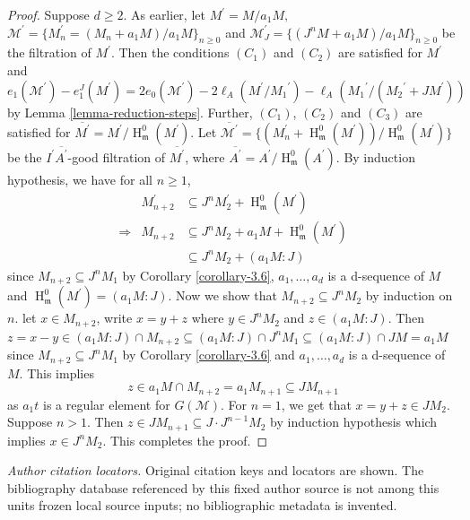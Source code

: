 \documentclass[10pt,a4paper]{amsart}
\def\M{{\mathcal M}}
\DeclareMathOperator{\h}{H}
\newcommand{\m}{\mathfrak m}
\begin{document}
\begin{proof}
	Suppose $d\geq 2.$ As earlier, let $M^\prime=M/a_1M,$ 
	$\M^\prime=\{M_n^\prime=(M_n+a_1M)/a_1M\}_{n\geq0}$ and $\M_J^\prime=\{(J^nM+a_1M)/a_1M\}_{n\geq 0}$ be the filtration of $M^\prime$. Then the conditions  $(C_1)$ and $(C_2)$ are satisfied for $M^\prime$ and
	$e_1(\M^\prime)-e_1^J(M^\prime)=2e_0(\M^\prime)-2\ell_A(M^\prime/{M_1}^\prime)-\ell_A({M_1}^\prime/({M_2}^\prime+JM^\prime))$ by Lemma \ref{lemma-reduction-steps}.
	Further, $(C_1)$, $(C_2)$ and $(C_3)$ are satisfied for $\overline{M^\prime}=M^\prime/\h_{\m}^0(M^\prime)$. 
	Let $\overline{\M^\prime} =\{(M_n^\prime+\h_{\m}^0(M^\prime))/\h_{\m}^0(M^\prime)\}$ be the $I^\prime \overline{A^\prime}$-good filtration of $\overline{M^\prime}$, where $\overline{A^\prime}=A^\prime/\h_{\m}^0(A^\prime)$. 
	By induction hypothesis, we have for all $n\geq 1$,
	\begin{eqnarray*}
		&M_{n+2}^\prime&\subseteq  J^n M_2 ^\prime+\h_{\m}^0(M^\prime)\\
		\Rightarrow & M_{n+2} & \subseteq J^n M_2+a_1M+\h_{\m}^0(M^\prime)\\
		&& \subseteq J^n M_2+(a_1M:J)
	\end{eqnarray*}
	since $M_{n+2}\subseteq J^nM_1$ by Corollary \ref{corollary-3.6}, $a_1,\ldots,a_d$ is a d-sequence of $M$ and $\h_{\m}^0(M^\prime)=(a_1M:J)$. Now we show that $M_{n+2}\subseteq J^nM_2$ by induction on $n$. let $x\in M_{n+2}$, write $x=y+z$ where $y\in J^nM_2$ and 
	$z\in (a_1M:J)$. Then $z=x-y\in (a_1M:J)\cap M_{n+2}\subseteq (a_1M:J)\cap J^n M_1\subseteq (a_1M:J)\cap JM =a_1M$ since
	$M_{n+2}\subseteq J^nM_1$ by Corollary \ref{corollary-3.6} and $a_1,\ldots,a_d$ is a d-sequence of $M$.  This implies $$z\in a_1M\cap M_{n+2}=a_1M_{n+1}\subseteq JM_{n+1}$$ as $a_1t$ is a regular element for $G(\mathcal{M})$. 
	For $n=1$, we get that $x=y+z\in JM_2$. Suppose $n>1$. Then $z\in JM_{n+1}\subseteq J\cdot J^{n-1}M_2$ by induction hypothesis which implies $x\in J^nM_2$. This completes the proof.
\end{proof}
\par\medskip\noindent\textit{Author citation locators.} Original citation keys and locators are shown. The bibliography database referenced by this fixed author source is not among this unit\textquotesingle s frozen local source inputs; no bibliographic metadata is invented.
\end{document}
